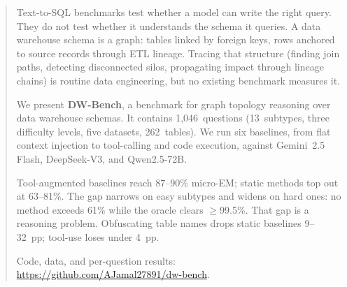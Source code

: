 \begin{abstract}
Text-to-SQL benchmarks test whether a model can write the right query.
They do not test whether it understands the schema it queries.
A data warehouse schema is a graph: tables linked by foreign keys,
rows anchored to source records through ETL lineage.
Tracing that structure (finding join paths, detecting disconnected silos,
propagating impact through lineage chains) is routine data engineering,
but no existing benchmark measures it.

We present \textbf{DW-Bench}, a benchmark for graph topology reasoning
over data warehouse schemas.  It contains
1,046~questions (13~subtypes, three difficulty levels, five datasets,
262~tables).  We run six baselines,
from flat context injection to tool-calling and code execution,
against Gemini~2.5 Flash, DeepSeek-V3, and Qwen2.5-72B.

Tool-augmented baselines reach 87--90\% micro-EM; static methods
top out at 63--81\%.  The gap narrows on easy subtypes and widens
on hard ones: no method exceeds 61\% while the oracle clears
$\geq$99.5\%.  That gap is a reasoning problem.
Obfuscating table names drops static baselines 9--32~pp; tool-use
loses under 4~pp.

Code, data, and per-question results:
\url{https://github.com/AJamal27891/dw-bench}.
\end{abstract}
